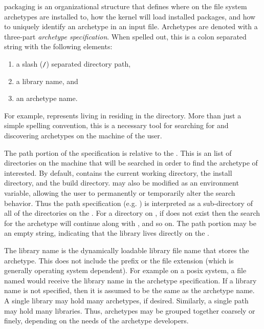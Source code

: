 \cyclus packaging is an organizational structure that defines where on the file system 
archetypes are installed to, how the \cyclus kernel will load installed
packages, and how to uniquely identify an archetype in an input file.  Archetypes 
are denoted with a three-part \emph{archetype specification}. When spelled out, this
is a colon separated string with the following elements:
\begin{enumerate}
    \item a slash (\texttt{/}) separated directory path,
    \item a library name, and
    \item an archetype name.
\end{enumerate}
For example,  represents  living
in  residing in the  directory. More than just 
a simple spelling convention, this is a necessary
tool for searching for and discovering archetypes on the machine of the user.

The path portion of the specification is relative to the . This is 
an list of directories on the machine that will be searched in order to find the 
archetype of interested. By default,  contains the current working 
directory, the \cyclus install directory, and the \cyclus build directory. 
 may also be modified as an environment variable, allowing the user
to permanently or temporarily alter the \cyclus search behavior.  Thus the path 
specification (e.g. ) is interpreted as a sub-directory of all of 
the directories on the . For a directory  on 
, if   does not exist then the search for 
the archetype will continue along with , and so on. The path portion 
may be an empty string, indicating that the library lives directly on the 
.

The library name is the dynamically loadable library file name that stores the 
archetype. This does not include the  prefix or the file extension 
(which is generally operating system dependent).  For example on a posix system,
a file named  would receive the library name 
in the archetype specification. 
If a library name is not specified, then it is assumed to be the same as the 
archetype name.
A single library may hold many archetypes, if desired.
Similarly, a single path may hold many libraries. Thus, archetypes may be grouped
together coarsely or finely, depending on the needs of the archetype developers.

